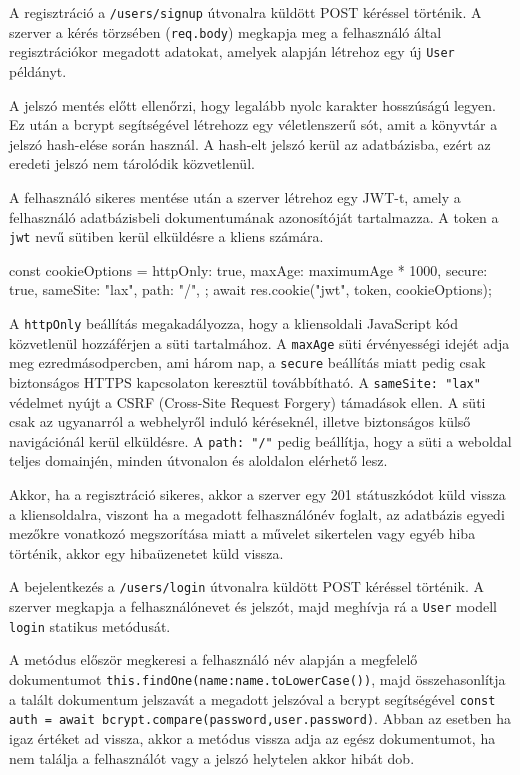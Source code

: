 
A regisztráció a \texttt{/users/signup} útvonalra küldött POST kéréssel történik. A szerver a kérés törzsében (\texttt{req.body}) megkapja meg a felhasználó által regisztrációkor megadott adatokat, amelyek alapján létrehoz egy új \texttt{User} példányt.

A jelszó mentés előtt ellenőrzi, hogy legalább nyolc karakter hosszúságú legyen. Ez után a bcrypt segítségével létrehozz egy véletlenszerű sót, amit a könyvtár a jelszó hash-elése során használ. A hash-elt jelszó kerül az adatbázisba, ezért az eredeti jelszó nem tárolódik közvetlenül.

A felhasználó sikeres mentése után a szerver létrehoz egy JWT-t, amely a felhasználó adatbázisbeli dokumentumának azonosítóját tartalmazza. A token a \texttt{jwt} nevű sütiben kerül elküldésre a kliens számára.
\begin{java}
const cookieOptions = {
    httpOnly: true,
    maxAge: maximumAge * 1000,
    secure: true,
    sameSite: "lax",
    path: "/",
};
await res.cookie("jwt", token, cookieOptions);
\end{java}
A \texttt{httpOnly} beállítás megakadályozza, hogy a kliensoldali JavaScript kód közvetlenül hozzáférjen a süti tartalmához. A \texttt{maxAge} süti érvényességi idejét adja meg ezredmásodpercben, ami három nap, a \texttt{secure} beállítás miatt pedig csak biztonságos HTTPS kapcsolaton keresztül továbbítható. A \texttt{sameSite: "lax"} védelmet nyújt a CSRF (Cross-Site Request Forgery) támadások ellen. A süti csak az ugyanarról a webhelyről induló kéréseknél, illetve biztonságos külső navigációnál kerül elküldésre. A \texttt{path: "/"} pedig beállítja, hogy a süti a weboldal teljes domainjén, minden útvonalon és aloldalon elérhető lesz.

Akkor, ha a regisztráció sikeres, akkor a szerver egy 201 státuszkódot küld vissza a kliensoldalra, viszont ha a megadott felhasználónév foglalt, az adatbázis egyedi mezőkre vonatkozó megszorítása miatt a művelet sikertelen vagy egyéb hiba történik, akkor egy hibaüzenetet küld vissza.


A bejelentkezés a \texttt{/users/login} útvonalra küldött POST kéréssel történik. A szerver megkapja a felhasználónevet és jelszót, majd meghívja rá a \texttt{User} modell \texttt{login} statikus metódusát. 

A metódus először megkeresi a felhasználó név alapján a megfelelő dokumentumot \texttt{this.findOne({name:name.toLowerCase()})}, majd összehasonlítja a talált dokumentum jelszavát a megadott jelszóval a bcrypt segítségével \texttt{const auth = await bcrypt.compare(password,user.password)}. Abban az esetben ha igaz értéket ad vissza, akkor a metódus vissza adja az egész dokumentumot, ha nem találja a felhasználót vagy a jelszó helytelen akkor hibát dob.

